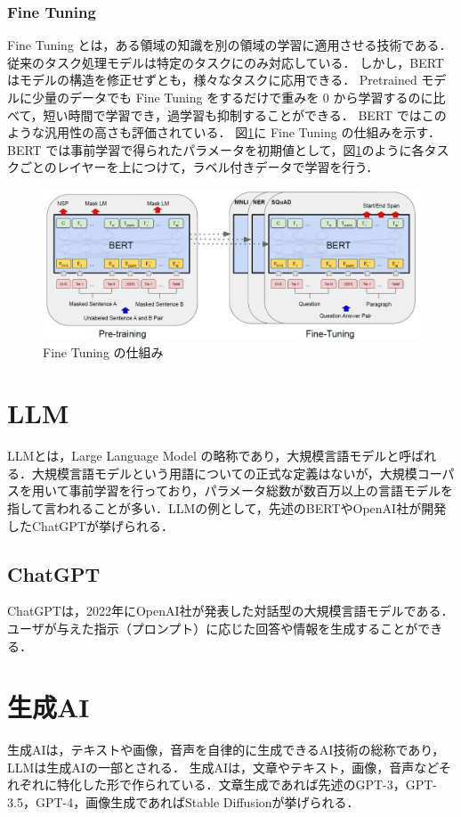 \subsubsection{Fine Tuning}
Fine Tuning とは，ある領域の知識を別の領域の学習に適用させる技術である．
従来のタスク処理モデルは特定のタスクにのみ対応している．
しかし，BERT はモデルの構造を修正せずとも，様々なタスクに応用できる．
Pretrained モデルに少量のデータでも Fine Tuning をするだけで重みを 0 から学習するのに比べて，短い時間で学習でき，過学習も抑制することができる．
BERT ではこのような汎用性の高さも評価されている．
図\ref{finetuning}に Fine Tuning の仕組みを示す．
BERT では事前学習で得られたパラメータを初期値として，図\ref{finetuning}のように各タスクごとのレイヤーを上につけて，ラベル付きデータで学習を行う．

\begin{figure}[H]
	\centering
	\includegraphics[width=120mm]{image/BERT-finetuning.png}
	\caption{Fine Tuning の仕組み}
	\label{finetuning}
\end{figure}



\section{LLM \label{c4s6}}
LLMとは，Large Language Model の略称であり，大規模言語モデルと呼ばれる．大規模言語モデルという用語についての正式な定義はないが，大規模コーパスを用いて事前学習を行っており，パラメータ総数が数百万以上の言語モデルを指して言われることが多い．LLMの例として，先述のBERTやOpenAI社が開発したChatGPTが挙げられる．

\subsection{ChatGPT}
ChatGPTは，2022年にOpenAI社が発表した対話型の大規模言語モデルである．ユーザが与えた指示（プロンプト）に応じた回答や情報を生成することができる．


\section{生成AI \label{c4s7}}
生成AIは，テキストや画像，音声を自律的に生成できるAI技術の総称であり，LLMは生成AIの一部とされる．
生成AIは，文章やテキスト，画像，音声などそれぞれに特化した形で作られている．文章生成であれば先述のGPT-3，GPT-3.5，GPT-4，画像生成であればStable Diffusionが挙げられる．

